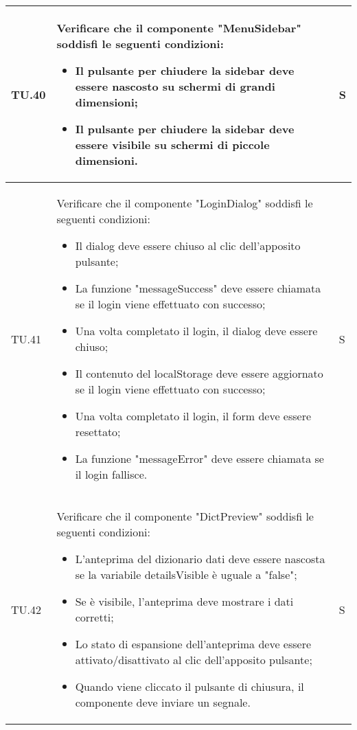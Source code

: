\begin{adjustwidth}{-0.5cm}{-0.5cm}
\begin{longtable}{|P{1.5cm}|>{\raggedright}P{9.5cm}|>{\arraybackslash}P{1.5cm}|}
		\hline TU.40 & Verificare che il componente "MenuSidebar" soddisfi le seguenti condizioni:
    \begin{itemize}
			\item Il pulsante per chiudere la sidebar deve essere nascosto su schermi di grandi dimensioni;
      \item Il pulsante per chiudere la sidebar deve essere visibile su schermi di piccole dimensioni.
    \end{itemize} & S \\

		\hline TU.41 & Verificare che il componente "LoginDialog" soddisfi le seguenti condizioni:
    \begin{itemize}
      \item Il dialog deve essere chiuso al clic dell'apposito pulsante;
			\item La funzione "messageSuccess" deve essere chiamata se il login viene effettuato con successo;
			\item Una volta completato il login, il dialog deve essere chiuso;
			\item Il contenuto del localStorage deve essere aggiornato se il login viene effettuato con successo;
			\item Una volta completato il login, il form deve essere resettato;
			\item La funzione "messageError" deve essere chiamata se il login fallisce.
    \end{itemize} & S \\

		\hline TU.42 & Verificare che il componente "DictPreview" soddisfi le seguenti condizioni:
    \begin{itemize}
      \item L'anteprima del dizionario dati deve essere nascosta se la variabile detailsVisible è uguale a "false";
			\item Se è visibile, l'anteprima deve mostrare i dati corretti;
			\item Lo stato di espansione dell'anteprima deve essere attivato/disattivato al clic dell'apposito pulsante;
			\item Quando viene cliccato il pulsante di chiusura, il componente deve inviare un segnale.
    \end{itemize} & S \\


\end{longtable}
\end{adjustwidth}
